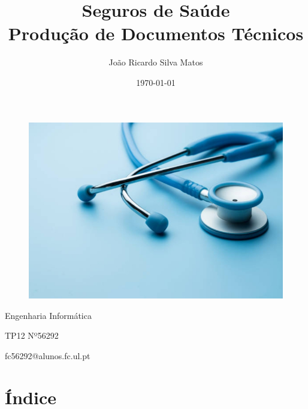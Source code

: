 \documentclass[11pt, a4paper]{article}
\title{\huge Seguros de Saúde\\ \vspace{0.3cm} \Large Produç\~ao de Documentos Técnicos}
\author{João Ricardo Silva Matos}
\date{\today}
\begin{document}
\maketitle
\thispagestyle{empty}

\begin{figure} [h]
\centering
\includegraphics[scale=0.5]{seguro-saude.jpg}
\end{figure}
\vspace*{\fill}
Engenharia Informática

TP12 Nº56292

fc56292@alunos.fc.ul.pt

\clearpage
\section{Índice}
\setcounter{page}{1}
\tableofcontents
\clearpage
\end{document}
